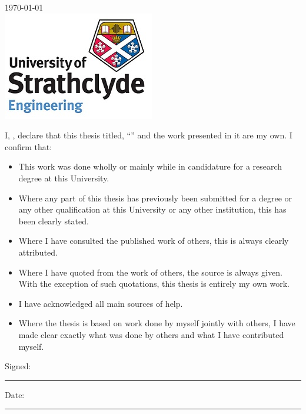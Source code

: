 \documentclass[
11pt, %
english, %
singlespacing, %
headsepline, %
]{MastersDoctoralThesis} %
\begin{document}
\begin{titlepage}
\begin{center}
 {\large \today}\\[1cm] %
 \bigskip
\includegraphics{img/uni_logo_eng.jpg} %
 
\vfill
\end{center}
\end{titlepage}


\begin{declaration}
\addchaptertocentry{\authorshipname}

\noindent I, \authorname, declare that this thesis titled, \enquote{\ttitle} and the work presented in it are my own. I confirm that:

\begin{itemize} 
\item This work was done wholly or mainly while in candidature for a research degree at this University.
\item Where any part of this thesis has previously been submitted for a degree or any other qualification at this University or any other institution, this has been clearly stated.
\item Where I have consulted the published work of others, this is always clearly attributed.
\item Where I have quoted from the work of others, the source is always given. With the exception of such quotations, this thesis is entirely my own work.
\item I have acknowledged all main sources of help.
\item Where the thesis is based on work done by myself jointly with others, I have made clear exactly what was done by others and what I have contributed myself.\\
\end{itemize}
 
\noindent Signed:\\
\rule[0.5em]{25em}{0.5pt} %
 
\noindent Date:\\
\rule[0.5em]{25em}{0.5pt} %
\end{declaration}
\end{document}
